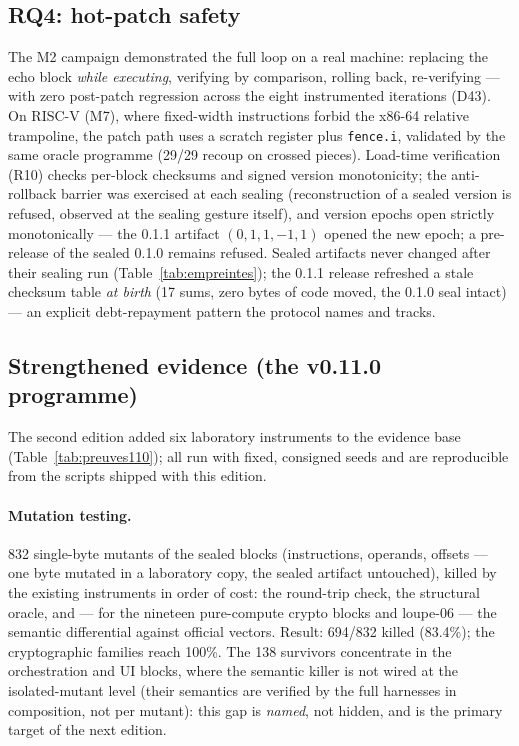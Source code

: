 \documentclass[11pt,a4paper]{article}
\newcommand{\code}[1]{\texttt{\small #1}}
\begin{document}
\subsection{RQ4: hot-patch safety}\label{sec:rq4}

The M2 campaign demonstrated the full loop on a real machine: replacing
the echo block \emph{while executing}, verifying by comparison,
rolling back, re-verifying --- with zero post-patch regression across the
eight instrumented iterations (D43). On RISC-V (M7), where fixed-width
instructions forbid the x86-64 relative trampoline, the patch path uses
a scratch register plus \code{fence.i}, validated by the same oracle
programme (29/29 recoup on crossed pieces). Load-time verification (R10)
checks per-block checksums and signed version monotonicity; the
anti-rollback barrier was exercised at each sealing (reconstruction of a
sealed version is refused, observed at the sealing gesture itself), and
version epochs open strictly monotonically --- the 0.1.1 artifact
$(0,1,1,-1,1)$ opened the new epoch; a pre-release of the sealed 0.1.0
remains refused. Sealed artifacts never changed after their sealing run
(Table~\ref{tab:empreintes}); the 0.1.1 release refreshed a stale
checksum table \emph{at birth} (17 sums, zero bytes of code moved, the
0.1.0 seal intact) --- an explicit debt-repayment pattern the protocol
names and tracks.

\subsection{Strengthened evidence (the v0.11.0 programme)}\label{sec:renforce}

The second edition added six laboratory instruments to the evidence base
(Table~\ref{tab:preuves110}); all run with fixed, consigned seeds and are
reproducible from the scripts shipped with this edition.

\paragraph{Mutation testing.} 832 single-byte mutants of the sealed blocks
(instructions, operands, offsets --- one byte mutated in a laboratory copy,
the sealed artifact untouched), killed by the existing instruments in
order of cost: the round-trip check, the structural oracle, and --- for
the nineteen pure-compute crypto blocks and loupe-06 --- the semantic
differential against official vectors. Result: 694/832 killed (83.4\%);
the cryptographic families reach 100\%. The 138 survivors concentrate in
the orchestration and UI blocks, where the semantic killer is not wired
at the isolated-mutant level (their semantics are verified by the full
harnesses in composition, not per mutant): this gap is \emph{named}, not
hidden, and is the primary target of the next edition.
\end{document}
